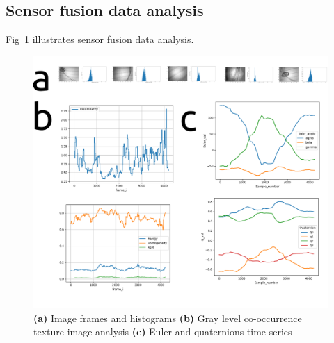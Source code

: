 \documentclass[11pt]{article}
\begin{document}
\subsection*{Sensor fusion data analysis}
Fig~\ref{fig:data-analysis} illustrates sensor fusion data analysis.

\begin{figure}[h]
\centering
\includegraphics[width=1.0\textwidth]{preliminary-data-analysis/outputs/drawing-v00}
    \caption{
        \textbf{(a)}
	    Image frames and histograms
	\textbf{(b)}
    	Gray level co-occurrence texture image analysis
	\textbf{(c)}
	    Euler and quaternions  time series
	    }
\label{fig:data-analysis}
\end{figure}


\newpage


\end{document}
